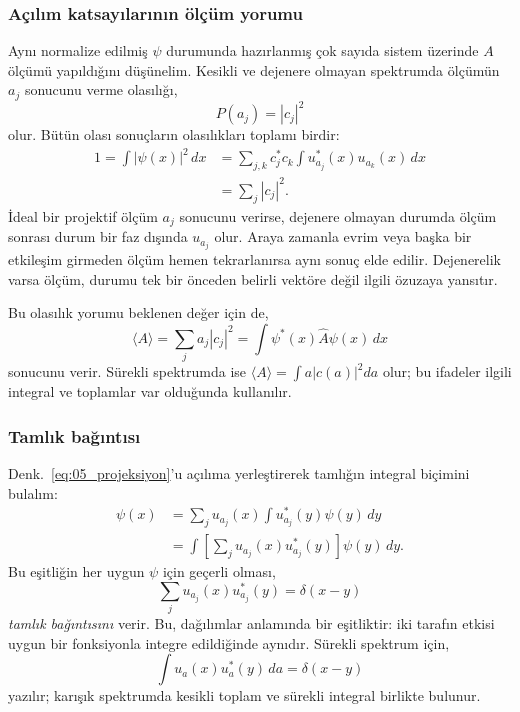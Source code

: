 \subsubsection{Açılım katsayılarının ölçüm yorumu}

Aynı normalize edilmiş $\psi$ durumunda hazırlanmış çok sayıda sistem
üzerinde $A$ ölçümü yapıldığını düşünelim. Kesikli ve dejenere olmayan
spektrumda ölçümün $a_j$ sonucunu verme olasılığı,
\begin{equation}
 P(a_j)=|c_j|^2
 \label{eq:05_born}
\end{equation}
olur. Bütün olası sonuçların olasılıkları toplamı birdir:
\begin{align}
 1=\int|\psi(x)|^2\,dx
 &=\sum_{j,k}c_j^*c_k\int u_{a_j}^*(x)u_{a_k}(x)\,dx\\
 &=\boxed{\sum_j|c_j|^2}.
 \label{eq:05_katsayi_norm}
\end{align}
İdeal bir projektif ölçüm $a_j$ sonucunu verirse, dejenere olmayan
durumda ölçüm sonrası durum bir faz dışında $u_{a_j}$ olur. Araya
zamanla evrim veya başka bir etkileşim girmeden ölçüm hemen
tekrarlanırsa aynı sonuç elde edilir. Dejenerelik varsa ölçüm, durumu
tek bir önceden belirli vektöre değil ilgili özuzaya yansıtır.

Bu olasılık yorumu beklenen değer için de,
\begin{equation}
 \langle A\rangle=\sum_j a_j|c_j|^2
 =\int\psi^*(x)\hat A\psi(x)\,dx
 \label{eq:05_beklenen}
\end{equation}
sonucunu verir. Sürekli spektrumda ise
$\langle A\rangle=\int a|c(a)|^2da$ olur; bu ifadeler ilgili
integral ve toplamlar var olduğunda kullanılır.

\subsubsection{Tamlık bağıntısı}

Denk.~\eqref{eq:05_projeksiyon}'u açılıma yerleştirerek tamlığın
integral biçimini bulalım:
\begin{align}
 \psi(x)&=\sum_j u_{a_j}(x)
                 \int u_{a_j}^*(y)\psi(y)\,dy\\
 &=\int\left[\sum_j u_{a_j}(x)u_{a_j}^*(y)\right]\psi(y)\,dy.
\end{align}
Bu eşitliğin her uygun $\psi$ için geçerli olması,
\begin{equation}
 \boxed{\sum_j u_{a_j}(x)u_{a_j}^*(y)=\delta(x-y)}
 \label{eq:05_tamlik}
\end{equation}
\emph{tamlık bağıntısını} verir. Bu, dağılımlar anlamında bir
eşitliktir: iki tarafın etkisi uygun bir fonksiyonla integre
edildiğinde aynıdır. Sürekli spektrum için,
\begin{equation}
 \int u_a(x)u_a^*(y)\,da=\delta(x-y)
 \label{eq:05_surekli_tamlik}
\end{equation}
yazılır; karışık spektrumda kesikli toplam ve sürekli integral
birlikte bulunur.

